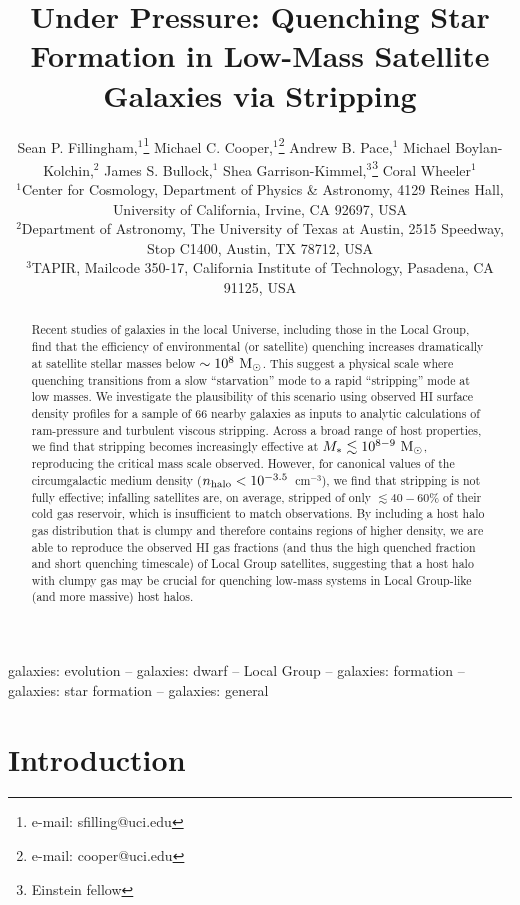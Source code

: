 \documentclass[usenatbib]{mn2e}
\title[Ch-Ch-Changing Satellites via Stripping]
{Under Pressure: Quenching Star Formation in Low-Mass Satellite Galaxies via
  Stripping}
\author[Fillingham et al.]
{Sean P. Fillingham,$^1$\thanks{$\!\!$e-mail: sfilling@uci.edu}
Michael C. Cooper,$^1$\thanks{$\!\!$e-mail: cooper@uci.edu} 
Andrew B. Pace,$^1$
%
\newauthor
Michael Boylan-Kolchin,$^2$
James S. Bullock,$^1$
Shea Garrison-Kimmel,$^3$\thanks{$\!\!$Einstein fellow} 
\newauthor 
Coral Wheeler$^1$ \\
$\!\!^1$Center for Cosmology, Department of Physics \& Astronomy,
4129 Reines Hall, University of California, Irvine, CA 92697, USA \\
$\!\!^2$Department of Astronomy, The University of Texas at Austin,
2515 Speedway, Stop C1400, Austin, TX 78712, USA \\
$\!\!^3$TAPIR, Mailcode 350-17, California Institute of Technology,
Pasadena, CA 91125, USA}
\newcommand{\msun}{{\rm M}_{\odot}}
\begin{document}
\pagerange{\pageref{firstpage}--\pageref{lastpage}} 

\maketitle

\label{firstpage}
\begin{abstract}

  Recent studies of galaxies in the local Universe, including those in
  the Local Group, find that the efficiency of environmental (or
  satellite) quenching increases dramatically at satellite stellar
  masses below $\sim10^{8}~\msun$. This suggest a physical scale
  where quenching transitions from a slow ``starvation'' mode to a
  rapid ``stripping'' mode at low masses.
%
  We investigate the plausibility of this scenario using observed
  H{\scriptsize I} surface density profiles for a sample of $66$
  nearby galaxies as inputs to analytic calculations of ram-pressure
  and turbulent viscous stripping. Across a broad range of host properties, we
  find that stripping becomes increasingly effective at
  $M_{*}\lesssim10^{8-9}~\msun$, reproducing the critical mass scale
  observed.
%
  However, for canonical values of the circumgalactic medium density
  ($n_{\rm halo} < 10^{-3.5}$~cm$^{-3}$), we find that stripping is
  not fully effective; infalling satellites are, on average, stripped
  of only $\lesssim40-60\%$ of their cold gas reservoir, which is
  insufficient to match observations.
%
  By including a host halo gas distribution that is clumpy and
  therefore contains regions of higher density, we are able to
  reproduce the observed H{\scriptsize I} gas fractions (and thus the
  high quenched fraction and short quenching timescale) of Local Group
  satellites, suggesting that a host halo with clumpy gas may be
  crucial for quenching low-mass systems in Local Group-like (and more
  massive) host halos.


\end{abstract}


\begin{keywords}
  galaxies: evolution -- galaxies: dwarf  -- Local Group --
  galaxies: formation -- galaxies: star formation -- galaxies: general
\end{keywords}

\section{Introduction}
\label{sec:intro} 
\end{document}
